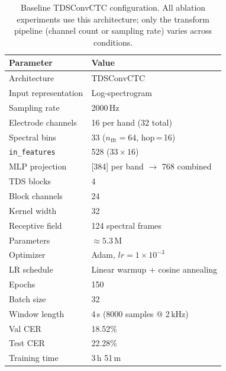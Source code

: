 

\begin{table}[h]
  \centering
  \caption{Baseline TDSConvCTC configuration. All ablation experiments use this
           architecture; only the transform pipeline (channel count or sampling
           rate) varies across conditions.}
  \label{tab:baseline_cnn_config}
  \begin{tabular}{ll}
    \toprule
    \textbf{Parameter} & \textbf{Value} \\
    \midrule
    Architecture          & TDSConvCTC \\
    Input representation  & Log-spectrogram \\
    Sampling rate         & 2000\,Hz \\
    Electrode channels    & 16 per hand (32 total) \\
    Spectral bins         & 33 \quad ($n_{\text{fft}}=64$, hop\,=\,16) \\
    \texttt{in\_features} & 528 \quad ($33 \times 16$) \\
    MLP projection        & [384] per band $\rightarrow$ 768 combined \\
    TDS blocks            & 4 \\
    Block channels        & 24 \\
    Kernel width          & 32 \\
    Receptive field       & 124 spectral frames \\
    Parameters            & ${\approx}5.3$\,M \\
    Optimizer             & Adam, $lr = 1\times10^{-3}$ \\
    LR schedule           & Linear warmup + cosine annealing \\
    Epochs                & 150 \\
    Batch size            & 32 \\
    Window length         & 4\,s (8000 samples @ 2\,kHz) \\
    \midrule
    Val CER               & 18.52\% \\
    Test CER              & 22.28\% \\
    Training time         & 3\,h 51\,m \\
    \bottomrule
  \end{tabular}
\end{table}


